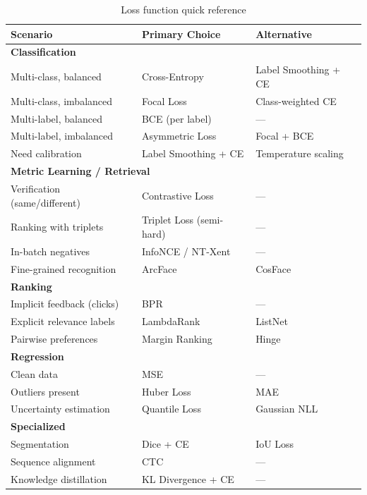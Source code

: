 \begin{table}[H]
\centering
\caption{Loss function quick reference}
\begin{tabularx}{\textwidth}{lXX}
\toprule
\textbf{Scenario} & \textbf{Primary Choice} & \textbf{Alternative} \\
\midrule
\multicolumn{3}{l}{\textbf{Classification}} \\
Multi-class, balanced & Cross-Entropy & Label Smoothing + CE \\
Multi-class, imbalanced & Focal Loss & Class-weighted CE \\
Multi-label, balanced & BCE (per label) & — \\
Multi-label, imbalanced & Asymmetric Loss & Focal + BCE \\
Need calibration & Label Smoothing + CE & Temperature scaling \\
\midrule
\multicolumn{3}{l}{\textbf{Metric Learning / Retrieval}} \\
Verification (same/different) & Contrastive Loss & — \\
Ranking with triplets & Triplet Loss (semi-hard) & — \\
In-batch negatives & InfoNCE / NT-Xent & — \\
Fine-grained recognition & ArcFace & CosFace \\
\midrule
\multicolumn{3}{l}{\textbf{Ranking}} \\
Implicit feedback (clicks) & BPR & — \\
Explicit relevance labels & LambdaRank & ListNet \\
Pairwise preferences & Margin Ranking & Hinge \\
\midrule
\multicolumn{3}{l}{\textbf{Regression}} \\
Clean data & MSE & — \\
Outliers present & Huber Loss & MAE \\
Uncertainty estimation & Quantile Loss & Gaussian NLL \\
\midrule
\multicolumn{3}{l}{\textbf{Specialized}} \\
Segmentation & Dice + CE & IoU Loss \\
Sequence alignment & CTC & — \\
Knowledge distillation & KL Divergence + CE & — \\
\bottomrule
\end{tabularx}
\end{table}

